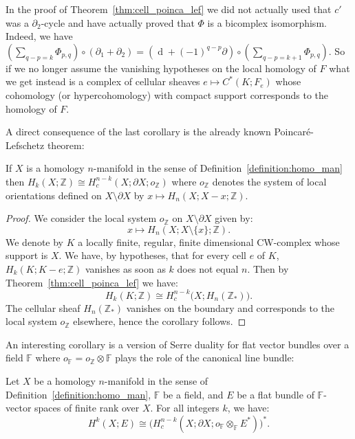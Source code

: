 \documentclass[AHL,Unicode,longabstracts,published]{cedram}
\newcommand{\Z}{\mathbb{Z}}
\newcommand{\F}{\mathbb{F}}
\DeclareMathOperator{\df}{d}
\begin{document}
\begin{rema}
In the proof of Theorem~\ref{thm:cell_poinca_lef} we did not actually used that $c'$ was a $\partial_2$-cycle and have actually proved that $\Phi$ is a bicomplex isomorphism. Indeed, we have $(\sum_{q-p=k}\Phi_{p,q})\circ(\partial_1+\partial_2)=(\df+(-1)^{q-p}\partial)\circ(\sum_{q-p=k+1}\Phi_{p,q})$. So if we no longer assume the vanishing hypotheses on the local homology of $F$ what we get instead is a complex of cellular sheaves $e\mapsto C^*(K;F_e)$ whose cohomology (or hypercohomology) with compact support corresponds to the homology of $F$.
\end{rema}

A direct consequence of the last corollary is the already known Poincaré-Lefschetz theorem:

\begin{coro}
If $X$ is a homology $n$-manifold in the sense of Definition~\ref{definition:homo_man} then $H_k(X;\Z)\cong H^{n-k}_c(X;\partial X; o_\Z)$ where $o_\Z$ denotes the system of local orientations defined on $X\setminus\partial X$ by $x\mapsto H_n(X;X-x;\Z)$.
\end{coro}

\begin{proof}
We consider the local system $o_\Z$ on $X\setminus \partial X$ given by:
\begin{equation*}
x\mapsto H_n(X;X\setminus\{x\};\Z).
\end{equation*}
We denote by $K$ a locally finite, regular, finite dimensional CW-complex whose support is $X$. We have, by hypotheses, that for every cell $e$ of $K$, $H_k(K;K-e;\Z)$ vanishes as soon as $k$ does not equal $n$. Then by Theorem~\ref{thm:cell_poinca_lef} we have:
\begin{equation*}
H_k(K;\Z)\cong H^{n-k}_c\big(X;H_n(\Z_*)\big).
\end{equation*}
The cellular sheaf $H_n(\Z_*)$ vanishes on the boundary and corresponds to the local system $o_\Z$ elsewhere, hence the corollary follows.
\end{proof}

An interesting corollary is a version of Serre duality for flat vector bundles over a field $\F$ where $o_\F=o_\Z\otimes\F$ plays the role of the canonical line bundle:

\begin{coro}
Let $X$ be a homology $n$-manifold in the sense of Definition~\ref{definition:homo_man}, $\F$ be a field, and $E$ be a flat bundle of $\F$-vector spaces of finite rank over $X$. For all integers $k$, we have:
\begin{equation*}
H^k(X;E)\cong \big(H^{n-k}_c(X;\partial X; o_\F\otimes_\F E^*)\big)^*.
\end{equation*}
\end{coro}
\end{document}
